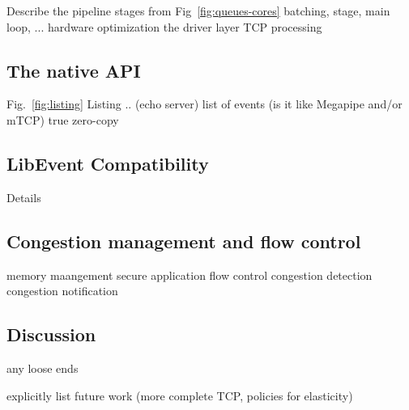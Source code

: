 %

\todo   Describe the pipeline stages from Fig~\ref{fig:queues-cores}
\todo   batching, stage, main loop, ...
\todo   hardware optimization
\todo   the driver layer
\todo   TCP processing
     
\subsection{The \ix native API}
\label{sec:impl:api}


\todo Fig.~\ref{fig:listing} Listing .. (echo server)
\todo list of events (is it like Megapipe and/or mTCP)
\todo  true zero-copy

\subsection{LibEvent Compatibility}
\label{sec:impl:libix}
\todo Details 


\subsection{Congestion management and flow control}
\label{sec:impl:net}

\todo memory maangement
\todo secure application flow control
\todo congestion detection
\todo congestion notification

\subsection{Discussion}
\label{sec:impl:discussion}

\todo any loose ends

\todo explicitly list future work (more complete TCP, policies for elasticity)


